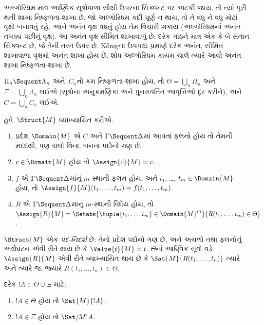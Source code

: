 અલ્ગોરિધમ માત્ર
આણ્વિક
સૂત્રોવાળા
સૌથી ઉપરના
સિક્વન્ટ પર
અટકી જાય,
તો ત્યાં પૂરી
થતી શાખા
નિષ્ફળતા-શાખા
છે. જો
અલ્ગોરિધમ
કદી પૂર્ણ ન
થાય, તો તે
વધુ ને વધુ
મોટાં વૃક્ષો
બનાવતું રહે.
આને અનંત
વૃક્ષ વધતું
હોય તેમ
વિચારી શકાય
(અલ્ગોરિધમનાં
અનંત તબક્કા
પછીનું વૃક્ષ).
આ અનંત વૃક્ષ
સીમિત શાખાવાળું
છે: દરેક ગાંઠને
માત્ર એક કે
બે સંતાન
સિક્વન્ટ છે,
જે તેની તરત
ઉપર છે.
K\H{o}nigના
ઉપપાદ્ય પ્રમાણે
દરેક અનંત,
સીમિત શાખાવાળા
વૃક્ષમાં અનંત
શાખા હોય છે.
શોધ અલ્ગોરિધમ
કાયમ ચાલે
ત્યારે આવી
અનંત શાખા
નિષ્ફળતા-શાખા
છે.

$\Pi_n \Sequent \Lambda_n$
અને~$C_n$નો
ક્રમ નિષ્ફળતા-શાખા
હોય, તો
$\Theta = \bigcup_n \Pi_n$
અને
$\Xi = \bigcup_n \Lambda_n$
લઈએ
(સૂત્રોના
અનુક્રમણિકા અને
પુનરાવર્તિત
આવૃત્તિઓ દૂર
કરીને), અને
$C =
\bigcup_n C_n$
લઈએ.

હવે~$\Struct{M}$
વ્યાખ્યાયિત કરીએ.
\begin{enumerate}
\item પ્રદેશ
$\Domain{M}$ એ
$C$ અને
$\Gamma \Sequent \Delta$માં
આવતાં
ફલનો
હોય તો તેમની
મદદથી, પણ
ચલો વિના,
બનતા પદોનો
ગણ છે.
\item $c \in \Domain{M}$
હોય તો
$\Assign{c}{M} = c$.
\item $f$ એ
$\Gamma \Sequent \Delta$માંનું
$m$-સ્થાની
ફલન
હોય, અને
$t_1$,
\dots,
$t_m \in \Domain{M}$
હોય, તો
$\Assign{f}{M}(t_1, \dots, t_m) =
f(t_1, \dots, t_m)$.
\item $R$ એ
$\Gamma \Sequent
\Delta$માંનું
$m$-સ્થાની
વિધેય
હોય, તો
$\Assign{R}{M} = \Setabs{\tuple{t_1, \dots, t_m} \in
\Domain{M}^m}{R(t_1, \dots, t_m) \in \Theta}$.
\end{enumerate}
$\Struct{M}$ એક
\emph{પદ-નિદર્શ}
છે: તેનો પ્રદેશ
પદોનો ગણ છે,
અને
અચળો તથા
ફલનોનું
અર્થઘટન એવી
રીતે થાય છે
કે
$\Value{t}{M} = t$.
$\Theta$નાં
આણ્વિક
સૂત્રો
વડે
$\Assign{R}{M}$
એવી રીતે
વ્યાખ્યાયિત
થાય છે કે
$\Sat{M}{R(t_1, \dots, t_n)}$
ત્યારે અને
ત્યારે જ,
જ્યારે
$R(t_1, \dots, t_n)
\in \Theta$.

\begin{lem}
દરેક
$!A \in \Theta \cup \Xi$
માટે:
\begin{enumerate}
  \item $!A \in \Theta$
  હોય તો
  $\Sat{M}{!A}$.
  \item $!A \in \Xi$
  હોય તો
  $\Sat/{M}{!A}$.
\end{enumerate}
\end{lem}

